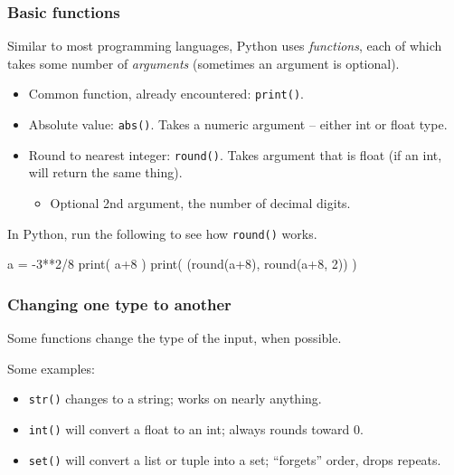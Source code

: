 \documentclass{beamer}
\newenvironment{codeblock}
    {\hfill\begin{beamerboxesrounded}[lower=codecol, width=0.8\textwidth]
    \medskip

    }
    { 
    \end{beamerboxesrounded}\hfill
    }
\theoremstyle{example}
\newcommand{\ttt}[1]{{\small\texttt{#1}}}
\begin{document}
\begin{frame}[fragile]
\frametitle{Basic functions}

Similar to most programming languages, Python uses \emph{functions}, each of which takes some number of \emph{arguments} (sometimes an argument is optional).

\pause
\begin{itemize}
	\item Common function, already encountered: \ttt{print()}.
	\pause
	\item Absolute value: \ttt{abs()}. Takes a numeric argument {--} either {\ttb int} or {\ttb float} type.
	\pause
	\item Round to nearest integer: \ttt{round()}. Takes argument that is {\ttb float} (if an {\ttb int}, will return the same thing).
	\begin{itemize}
		\item Optional 2nd argument, the number of decimal digits.
	\end{itemize}
\end{itemize}
\pause
In Python, run the following to see how \ttt{round()} works.

\begin{codeblock}

\begin{python}
a = -3**2/8
print( a+8 )
print( (round(a+8), round(a+8, 2)) )
\end{python}

\end{codeblock}

\end{frame}

\begin{frame}
\frametitle{Changing one type to another}
Some functions change the type of the input, when possible. 

\pause
Some examples:

\begin{itemize}
	\item \ttt{str()} changes to a string; works on nearly anything.
	\pause
	\item \ttt{int()} will convert a float to an int; always rounds toward 0.
	\pause
	\item \ttt{set()} will convert a list or tuple into a set; ``forgets'' order, drops repeats.
\end{itemize}
\end{frame}
\end{document}
